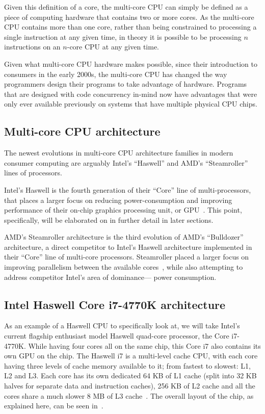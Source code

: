 \documentclass[a4paper,11pt]{article}
\begin{document}
Given this definition of a core, the multi-core CPU can simply be defined as a piece of computing hardware that contains
two or more cores. As the multi-core CPU contains more than one core, rather than being constrained to processing a single
instruction at any given time, in theory it is possible to be processing $n$ instructions on an $n$-core CPU at any given time.

Given what multi-core CPU hardware makes possible, since their introduction to consumers in the early 2000s, the multi-core
CPU has changed the way programmers design their programs to take advantage of hardware. Programs that are designed with
code concurrency in-mind now have advantages that were only ever available previously on systems that have multiple physical
CPU chips.

\subsection{Multi-core CPU architecture} %
\label{sub:multi_core_cpu_architecture}
The newest evolutions in multi-core CPU architecture families in modern consumer computing are arguably Intel's
``Haswell'' and AMD's ``Steamroller'' lines of processors.

Intel's Haswell is the fourth generation of their ``Core'' line of multi-processors, that places a larger focus on reducing power-consumption and improving performance of their on-chip graphics processing unit, or GPU~\cite{web:ForbesHaswell}. This point, specifically, will be elaborated on in further detail in later sections.

AMD's Steamroller architecture is the third evolution of AMD's ``Bulldozer''
architecture, a direct competitor to Intel's Haswell architecture implemented
in their ``Core'' line of multi-core processors. Steamroller placed a larger focus on improving parallelism between the available cores~\cite{web:AMDCCCSlides}, while also attempting to address competitor Intel's area of dominance--- power
consumption.

\subsection{Intel Haswell Core i7-4770K architecture} %
\label{sub:intel_haswell_architecture}
As an example of a Haswell CPU to specifically look at, we will take Intel's
current flagship enthusiast model Haswell quad-core processor, the Core i7-4770K. While having four cores all on the same chip, this Core i7 also
contains its own GPU on the chip. The Haswell i7 is a multi-level cache CPU, with each core having three levels of cache memory
available to it; from fastest to slowest: L1, L2 and L3. Each core has its own
dedicated 64 KB of L1 cache (split into 32 KB halves for separate data and instruction caches), 256 KB of L2 cache and all the cores share a much slower 8 MB of L3 cache~\cite{web:TomsHWCorei7}. The overall layout of the chip, as explained here, can be seen in~.
\end{document}
